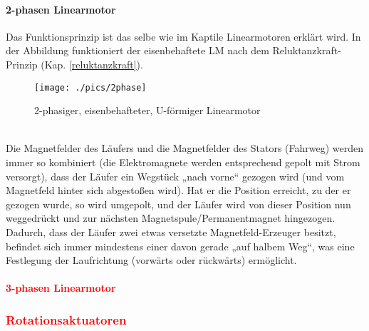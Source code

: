 				\paragraph{2-phasen Linearmotor} 
					Das Funktionsprinzip ist das selbe wie im Kaptile Linearmotoren erklärt wird. In der Abbildung funktioniert der eisenbehaftete LM nach dem Reluktanzkraft-Prinzip (Kap. \ref{reluktanzkraft}).	\\
					\begin{figure}[h]
						\centering
						\texttt{[image: ./pics/2phase]}
						\caption{2-phasiger, eisenbehafteter, U-förmiger Linearmotor}
					\end{figure} \\
					Die Magnetfelder des Läufers und die Magnetfelder des Stators (\glqq Fahrweg\grqq) werden immer so kombiniert (die Elektromagnete werden entsprechend gepolt mit Strom versorgt), dass der Läufer ein Wegstück „nach vorne“ gezogen wird (und vom Magnetfeld hinter sich abgestoßen wird). Hat er die Position erreicht, zu der er gezogen wurde, so wird umgepolt, und der Läufer wird von dieser Position nun weggedrückt und zur nächsten Magnetspule/Permanentmagnet hingezogen. Dadurch, dass der Läufer zwei etwas versetzte Magnetfeld-Erzeuger besitzt, befindet sich immer mindestens einer davon gerade „auf halbem Weg“, was eine Festlegung der Laufrichtung (vorwärts oder rückwärts) ermöglicht.
				\paragraph{\textcolor{red}{3-phasen Linearmotor}} 
			\subsubsection{\textcolor{red}{Rotationsaktuatoren}}
